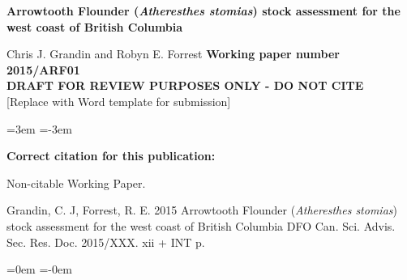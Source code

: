 
\thispagestyle{fancyplain}

\begin{flushleft}
\LARGE \textbf{Arrowtooth Flounder ({\bf \emph{Atheresthes stomias}}) stock assessment for the west coast of British Columbia}

\end{flushleft}
\vfill
{\Large Chris J. Grandin and Robyn E. Forrest}
\vfill
\vfill
\vfill
{\LARGE \textbf{Working paper number 2015/ARF01}}\\
{\LARGE \textbf{DRAFT FOR REVIEW PURPOSES ONLY - DO NOT CITE}}\\
\vspace{2cm}
[Replace with Word template for submission]
\vfill
\clearpage

\renewcommand{\contentsname}{\bf \large \vspace{-25mm} TABLE OF CONTENTS}

\begin{center}
\tableofcontents
\end{center}
\newpage

\leftskip=3em	%
\parindent=-3em

{\bf Correct citation for this publication:}

Non-citable Working Paper.	%

Grandin, C. J, Forrest, R. E. 2015
Arrowtooth Flounder (\emph{Atheresthes stomias}) stock assessment for the west coast of British Columbia
DFO Can. Sci. Advis. Sec. Res. Doc. 2015/XXX. xii + INT p.

\leftskip=0em	%
\parindent=-0em
